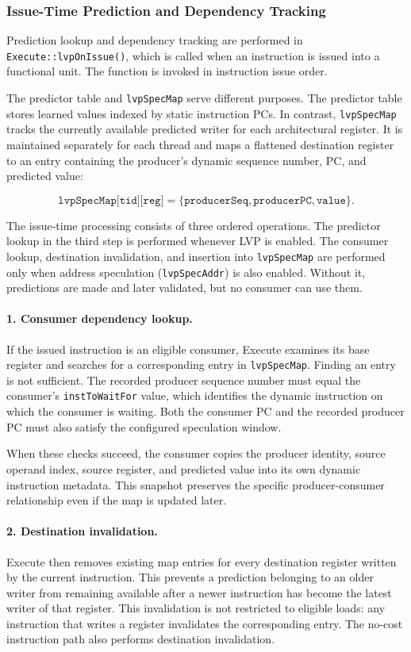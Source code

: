 \subsubsection{Issue-Time Prediction and Dependency Tracking}

Prediction lookup and dependency tracking are performed in
\texttt{Execute::lvpOnIssue()}, which is called when an instruction
is issued into a functional unit. The function is invoked in
instruction issue order.

The predictor table and \texttt{lvpSpecMap} serve different purposes.
The predictor table stores learned values indexed by static
instruction PCs. In contrast, \texttt{lvpSpecMap} tracks the
currently available predicted writer for each architectural register.
It is maintained separately for each thread and maps a flattened
destination register to an entry containing the producer's dynamic
sequence number, PC, and predicted value:

\[
\texttt{lvpSpecMap[tid][reg]}
=
\{\texttt{producerSeq},\texttt{producerPC},\texttt{value}\}.
\]

The issue-time processing consists of three ordered operations.
The predictor lookup in the third step is performed whenever LVP is
enabled. The consumer lookup, destination invalidation, and insertion
into \texttt{lvpSpecMap} are performed only when address speculation
(\texttt{lvpSpecAddr}) is also enabled. Without it, predictions are
made and later validated, but no consumer can use them.

\paragraph{1. Consumer dependency lookup.}
If the issued instruction is an eligible consumer, Execute examines
its base register and searches for a corresponding entry in
\texttt{lvpSpecMap}. Finding an entry is not sufficient. The recorded
producer sequence number must equal the consumer's
\texttt{instToWaitFor} value, which identifies the dynamic instruction
on which the consumer is waiting. Both the consumer PC and the
recorded producer PC must also satisfy the configured speculation
window.

When these checks succeed, the consumer copies the producer identity,
source operand index, source register, and predicted value into its
own dynamic instruction metadata. This snapshot preserves the
specific producer-consumer relationship even if the map is updated
later.

\paragraph{2. Destination invalidation.}
Execute then removes existing map entries for every destination
register written by the current instruction. This prevents a
prediction belonging to an older writer from remaining available
after a newer instruction has become the latest writer of that
register. This invalidation is not restricted to eligible loads:
any instruction that writes a register invalidates the corresponding
entry. The no-cost instruction path also performs destination
invalidation.


